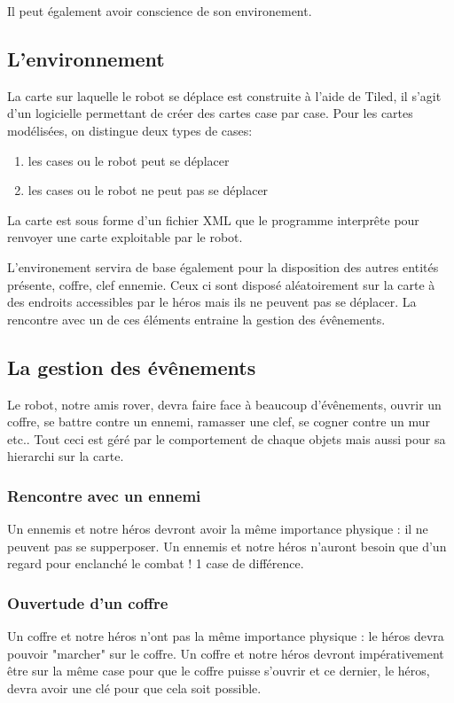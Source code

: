 \documentclass[a4paper 12pts]{article}
\begin{document}
Il peut également avoir conscience de son environement. 

\subsection{L'environnement}
La carte sur laquelle le robot se déplace est construite à l'aide de Tiled, il s'agit d'un logicielle permettant de créer des cartes case par case. 
Pour les cartes modélisées, on distingue deux types de cases:

\begin{enumerate}
	\item les cases ou le robot peut se déplacer
	\item les cases ou le robot ne peut pas se déplacer
\end{enumerate}

La carte est sous forme d'un fichier XML que le programme interprête pour renvoyer une carte exploitable par le robot.

L'environement servira de base également pour la disposition des autres entités présente, coffre, clef ennemie.
Ceux ci sont disposé aléatoirement sur la carte à des endroits accessibles par le héros mais ils ne peuvent pas se déplacer.
La rencontre avec un de ces éléments entraine la gestion des évênements.

\subsection{La gestion des évênements}

Le robot, notre amis rover, devra faire face à beaucoup d'évênements, ouvrir un coffre, se battre contre un ennemi, ramasser une clef, se cogner contre un mur etc..
Tout ceci est géré par le comportement de chaque objets mais aussi pour sa hierarchi sur la carte.

\subsubsection {Rencontre avec un ennemi} 
Un ennemis et notre héros devront avoir la même importance physique : il ne peuvent pas se supperposer.
Un ennemis et notre héros n'auront besoin que d'un regard pour enclanché le combat ! 1 case de différence.


\subsubsection {Ouvertude d'un coffre}
Un coffre et notre héros n'ont pas la même importance physique : le héros devra pouvoir "marcher" sur le coffre.
Un coffre et notre héros devront impérativement être sur la même case pour que le coffre puisse s'ouvrir et ce dernier, 
le héros, devra avoir une clé pour que cela soit possible.
\end{document}
